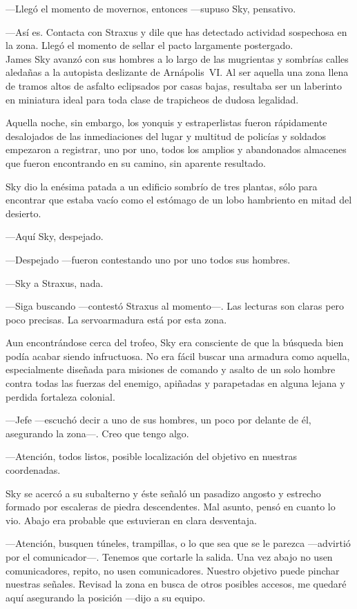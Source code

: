 ---Llegó el momento de movernos, entonces ---supuso Sky, pensativo.

---Así es. Contacta con Straxus y dile que has detectado actividad sospechosa en la zona. Llegó el momento de sellar el pacto largamente postergado.\\

\noindent{}James Sky avanzó con sus hombres a lo largo de las mugrientas y sombrías calles aledañas a la autopista deslizante de Arnápolis~VI. Al ser aquella una zona llena de tramos altos de asfalto eclipsados por casas bajas, resultaba ser un laberinto en miniatura ideal para toda clase de trapicheos de dudosa legalidad.

Aquella noche, sin embargo, los yonquis y estraperlistas fueron rápidamente desalojados de las inmediaciones del lugar y multitud de policías y soldados empezaron a registrar, uno por uno, todos los amplios y abandonados almacenes que fueron encontrando en su camino, sin aparente resultado.

Sky dio la enésima patada a un edificio sombrío de tres plantas, sólo para encontrar que estaba vacío como el estómago de un lobo hambriento en mitad del desierto.

---Aquí Sky, despejado.

---Despejado ---fueron contestando uno por uno todos sus hombres.

---Sky a Straxus, nada.

---Siga buscando ---contestó Straxus al momento---. Las lecturas son claras pero poco precisas. La servoarmadura está por esta zona.

Aun encontrándose cerca del trofeo, Sky era consciente de que la búsqueda bien podía acabar siendo infructuosa. No era fácil buscar una armadura como aquella, especialmente diseñada para misiones de comando y asalto de un solo hombre contra todas las fuerzas del enemigo, apiñadas y parapetadas en alguna lejana y perdida fortaleza colonial.

---Jefe ---escuchó decir a uno de sus hombres, un poco por delante de él, asegurando la zona---. Creo que tengo algo.

---Atención, todos listos, posible localización del objetivo en nuestras coordenadas.

Sky se acercó a su subalterno y éste señaló un pasadizo angosto y estrecho formado por escaleras de piedra descendentes. Mal asunto, pensó en cuanto lo vio. Abajo era probable que estuvieran en clara desventaja.

---Atención, busquen túneles, trampillas, o lo que sea que se le parezca ---advirtió por el comunicador---. Tenemos que cortarle la salida. Una vez abajo no usen comunicadores, repito, no usen comunicadores. Nuestro objetivo puede pinchar nuestras señales. Revisad la zona en busca de otros posibles accesos, me quedaré aquí asegurando la posición ---dijo a su equipo.

